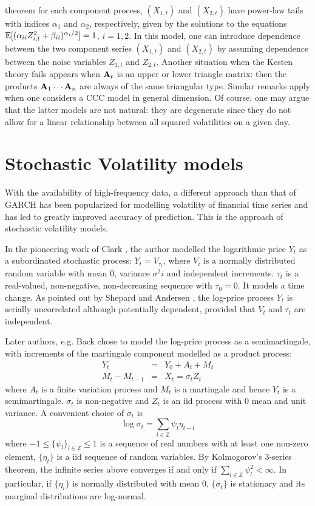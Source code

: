 theorem for each component process, $(X_{1,t})$ and $(X_{2,t})$ have
power-law tails  with indices $\alpha_1$ and $\alpha_2$, respectively,
given by the solutions to the equations  $\mathbb{E} [(\alpha_{ii}
Z_{i,t}^2+\beta_{ii})^{\alpha_i/2}]=1$, $i=1,2$. In this model, one
can introduce dependence between the two component series $(X_{1,t})$
and $(X_{2,t})$ by assuming dependence between the noise variables
$Z_{1,t}$ and $Z_{2,t}$. Another situation when the Kesten theory fails 
appears when ${\mathbf A}_t$ is an upper or lower triangle matrix: then the
products  ${\mathbf A}_1\cdots{\mathbf A}_n$ are always of the same triangular
type. 
Similar remarks apply when one considers a CCC model in general
dimension. Of course, one may argue that the latter models 
are not natural: they are degenerate since they do not allow 
for a linear relationship between all squared volatilities on a given
day.

\section{Stochastic Volatility models}
With the availability of high-frequency data, a different approach
than that of GARCH has been popularized for modelling volatility of
financial time series and has led to greatly improved accuracy of
prediction. This is the approach of stochastic volatility models.

In the pioneering work of Clark \cite{clark:1973}, the author modelled
the logarithmic price $Y_t$ as a subordinated stochastic process:
$Y_t = V_{\tau_t}$, where $V_i$ is a normally distributed random
variable with mean 0, variance $\sigma^2 i$ and independent
increments. $\tau_t$ is a real-valued, non-negative, non-decreasing
sequence with $\tau_0 = 0$. It models a time change. As pointed out by
Shepard and Andersen \cite{Shephard:Andersen:2009}, the log-price
process $Y_t$ is serially uncorrelated although potentially dependent,
provided that $V_t$ and $\tau_t$ are independent.

Later authors, e.g. Back \cite{back:1991} chose to model the log-price
process as a semimartingale, with increments of the martingale
component modelled as a product process:
\begin{eqnarray*}
  Y_t &=& Y_0 + A_t + M_t \\
  M_t - M_{t-1} &=& X_t = \sigma_t Z_t
\end{eqnarray*}
where $A_t$ is a finite variation process and $M_t$ is a martingale
and hence $Y_t$ is a semimartingale. $\sigma_t$ is non-negative and
$Z_t$ is an iid process with 0 mean and unit variance. A convenient
choice of $\sigma_t$ is
\begin{equation}
  \label{eq:rfht}
  \log\sigma_t = \sum_{l \in \mathbb Z} \psi_l \eta_{t-l}  
\end{equation}
where $-1 \leq \{\psi_l\}_{l \in \mathbb Z} \leq 1$
is a sequence of real numbers with at least one non-zero element,
$\{\eta_t\}$ is a iid sequence of random variables. By Kolmogorov's
3-series theorem, the infinite series above converges if and only if
$\sum_{l \in \mathbb Z} \psi_l^2 < \infty$.
In particular, if $\{\eta_i\}$ is normally distributed with mean 0,
$\{\sigma_t\}$ is stationary and its marginal distributions are
log-normal.

